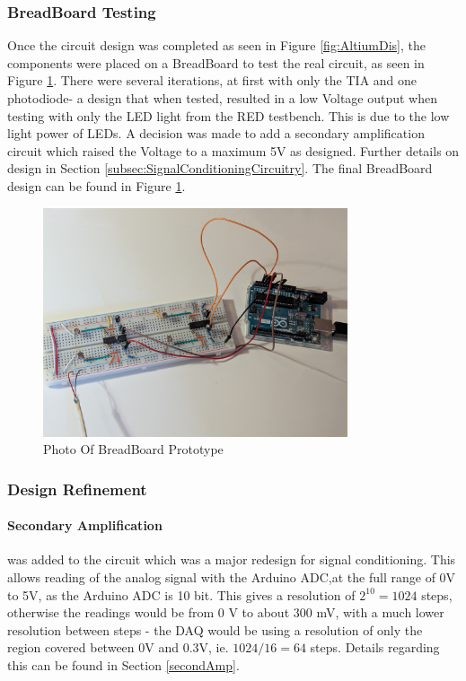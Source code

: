 %
%
\subsubsection*{BreadBoard Testing}

Once the circuit design was completed as seen in Figure  \ref{fig:AltiumDis}, the components were placed on a BreadBoard to test the real circuit, as seen in Figure \ref{fig:BreadBoardPhoto}. 
There were several iterations, at first with only the \ac{TIA} and one photodiode- a design that when tested, resulted in a low Voltage output when testing with only the \ac{LED} light from the \ac{RED} testbench. This is due to the low light power of \acp{LED}. A decision was made to add a secondary amplification circuit which raised the Voltage to a maximum 5V as designed. Further details on design in Section \ref{subsec:SignalConditioningCircuitry}. The final BreadBoard design can be found in Figure \ref{fig:BreadBoardPhoto}.



%
\begin{figure}[htbp] %
  \centering
  \includegraphics[width=0.8\textwidth]{chapters/methodology/prototype/BreadBoardPhoto.jpg}
  \caption{Photo Of BreadBoard Prototype}
  \label{fig:BreadBoardPhoto}
\end{figure}



\subsubsection*{Design Refinement}
\label{explainPostAmp}
\paragraph{Secondary Amplification} was added to the circuit which was a major redesign for signal conditioning. This allows reading of the analog signal with the Arduino \ac{ADC},at the full range of 0V to 5V, as the Arduino \ac{ADC} is 10 bit. This gives a resolution of  $2^{10}=1024$ steps, otherwise the readings would be from 0 V to about 300 mV, with a much lower resolution between steps - the DAQ would be using a resolution of only the region covered between 0V and 0.3V, ie. $1024/16=64$ steps. Details regarding this can be found in Section \ref{secondAmp}.
